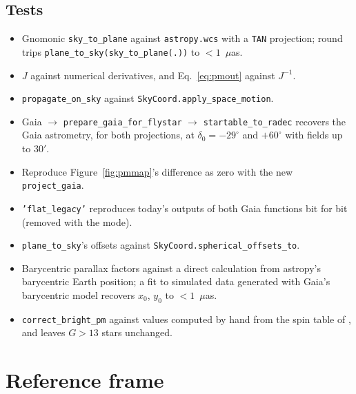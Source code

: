 \documentclass[11pt]{article}
\newcommand{\code}[1]{\texttt{#1}}
\newcommand{\muas}{$\mu$as}
\begin{document}
\subsection{Tests}
\begin{itemize}
  \item Gnomonic \code{sky\_to\_plane} against \code{astropy.wcs} with a
    \code{TAN} projection; round trips \code{plane\_to\_sky(sky\_to\_plane(.))}
    to $<1$~\muas.
  \item $J$ against numerical derivatives, and Eq.~\eqref{eq:pmout} against
    $J^{-1}$.
  \item \code{propagate\_on\_sky} against \code{SkyCoord.apply\_space\_motion}.
  \item Gaia $\to$ \code{prepare\_gaia\_for\_flystar} $\to$
    \code{startable\_to\_radec} recovers the Gaia astrometry, for both
    projections, at $\delta_0 = -29^\circ$ and $+60^\circ$ with fields up to
    $30'$.
  \item Reproduce Figure~\ref{fig:pmmap}'s difference as zero with the new
    \code{project\_gaia}.
  \item \code{'flat\_legacy'} reproduces today's outputs of both Gaia
    functions bit for bit (removed with the mode).
  \item \code{plane\_to\_sky}'s offsets against
    \code{SkyCoord.spherical\_offsets\_to}.
  \item Barycentric parallax factors against a direct calculation from
    astropy's barycentric Earth position; a fit to simulated data generated
    with Gaia's barycentric model recovers $x_0$, $y_0$ to $<1$~\muas.
  \item \code{correct\_bright\_pm} against values computed by hand from the
    spin table of \citet{CantatGaudin2021}, and leaves $G > 13$ stars unchanged.
\end{itemize}

\section{Reference frame}
\label{sec:frame}
\end{document}

